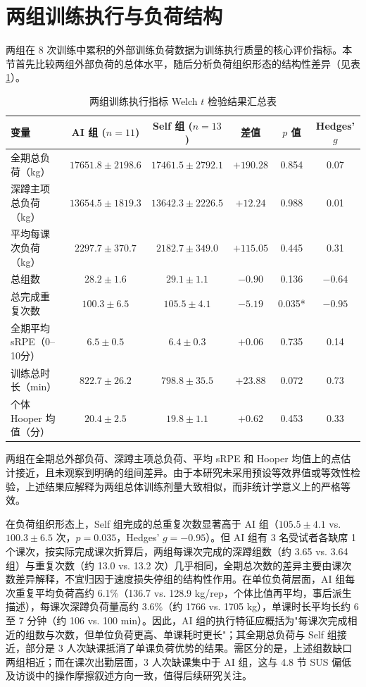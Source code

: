 \documentclass[UTF8,zihao=-4,twoside,openany]{ctexbook}
\begin{document}
\section{两组训练执行与负荷结构}
两组在 8 次训练中累积的外部训练负荷数据为训练执行质量的核心评价指标。本节首先比较两组外部负荷的总体水平，随后分析负荷组织形态的结构性差异（见表 \ref{tab:ch4-execution}）。

\begin{table}[htbp]
  \centering
  \caption{两组训练执行指标 Welch $t$ 检验结果汇总表}
  \label{tab:ch4-execution}
  \vspace{6pt}
  \small
  \begin{tabularx}{\textwidth}{lccccc}
    \toprule
    \textbf{变量} & \textbf{AI 组 ($n=11$)} & \textbf{Self 组 ($n=13$)} & \textbf{差值} & \textbf{$p$ 值} & \textbf{Hedges' $g$} \\
    \midrule
    全期总负荷（kg） & $17651.8 \pm 2198.6$ & $17461.5 \pm 2792.1$ & $+190.28$ & 0.854 & 0.07 \\
    深蹲主项总负荷（kg） & $13654.5 \pm 1819.3$ & $13642.3 \pm 2226.5$ & $+12.24$ & 0.988 & 0.01 \\
    平均每课次负荷（kg） & $2297.7 \pm 370.7$ & $2182.7 \pm 349.0$ & $+115.05$ & 0.445 & 0.31 \\
    总组数 & $28.2 \pm 1.6$ & $29.1 \pm 1.1$ & $-0.90$ & 0.136 & $-0.64$ \\
    总完成重复次数 & $100.3 \pm 6.5$ & $105.5 \pm 4.1$ & $-5.19$ & 0.035* & $-0.95$ \\
    全期平均 sRPE（0--10分） & $6.5 \pm 0.5$ & $6.4 \pm 0.3$ & $+0.06$ & 0.735 & 0.14 \\
    训练总时长（min） & $822.7 \pm 26.2$ & $798.8 \pm 35.5$ & $+23.88$ & 0.072 & 0.73 \\
    个体 Hooper 均值（分） & $20.4 \pm 2.5$ & $19.8 \pm 1.1$ & $+0.62$ & 0.453 & 0.33 \\
    \bottomrule
  \end{tabularx}
\end{table}

两组在全期总外部负荷、深蹲主项总负荷、平均 sRPE 和 Hooper 均值上的点估计接近，且未观察到明确的组间差异。由于本研究未采用预设等效界值或等效性检验，上述结果应解释为两组总体训练剂量大致相似，而非统计学意义上的严格等效。

在负荷组织形态上，Self 组完成的总重复次数显著高于 AI 组（$105.5 \pm 4.1$ vs. $100.3 \pm 6.5$ 次，$p = 0.035$，Hedges' $g = -0.95$）。但 AI 组有 3 名受试者各缺席 1 个课次，按实际完成课次折算后，两组每课次完成的深蹲组数（约 3.65 vs. 3.64 组）与重复次数（约 13.0 vs. 13.2 次）几乎相同，全期总次数的差异主要由课次数差异解释，不宜归因于速度损失停组的结构性作用。在单位负荷层面，AI 组每次重复平均负荷高约 6.1\%（136.7 vs. 128.9 kg/rep，个体比值再平均，事后派生描述），每课次深蹲负荷量高约 3.6\%（约 1766 vs. 1705 kg），单课时长平均长约 6 至 7 分钟（约 106 vs. 100 min）。因此，AI 组的执行特征应概括为"每课次完成相近的组数与次数，但单位负荷更高、单课耗时更长"；其全期总负荷与 Self 组接近，部分是 3 人次缺课抵消了单课负荷优势的结果。需区分的是，上述组数缺口两组相近；而在课次出勤层面，3 人次缺课集中于 AI 组，这与 4.8 节 SUS 偏低及访谈中的操作摩擦叙述方向一致，值得后续研究关注。
\end{document}
